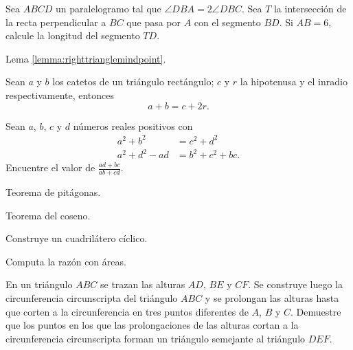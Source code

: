 \begin{problem}
Sea $ABCD$ un paralelogramo tal que $\angle DBA = 2\angle DBC$. Sea $T$ la intersección
de la recta perpendicular a $BC$ que pasa por $A$ con el segmento $BD$. Si
$AB = 6$, calcule la longitud del segmento $TD$.

\begin{hints}
	\begin{hint}
		Lema \ref{lemma:righttrianglemindpoint}.
	\end{hint}
\end{hints}
\end{problem}

\begin{problem}
Sean $a$ y $b$ los catetos de un triángulo rectángulo;
$c$ y $r$ la hipotenusa y el inradio respectivamente,
entonces
\[a + b = c + 2r.\]
\end{problem}

\begin{problem}
Sean $a$, $b$, $c$ y $d$ números reales positivos con
\begin{align*}
	a^2 + b^2      & =       c^2 + d^2  \\
	a^2 + d^2 - ad & =  b^2 + c^2 + bc.
\end{align*}
Encuentre el valor de $\frac{ad + bc}{ab + cd}$.

\begin{hints}
	\begin{hint}
		Teorema de pitágonas.
	\end{hint}

	\begin{hint}
		Teorema del coseno.
	\end{hint}

	\begin{hint}
		Construye un cuadrilátero cíclico.
	\end{hint}

	\begin{hint}
		Computa la razón con áreas.
	\end{hint}
\end{hints}
\end{problem}

\begin{problem}[OMAPA 2010/5]
En un triángulo $ABC$ se trazan las alturas $AD$, $BE$ y $CF$.
Se construye luego la circunferencia circunscripta del
triángulo $ABC$ y se prolongan las alturas hasta que corten
a la circunferencia en tres puntos diferentes de $A$, $B$ y $C$.
Demuestre que los puntos en los que las prolongaciones
de las alturas cortan a la circunferencia circunscripta
forman un triángulo semejante al triángulo $DEF$.
\end{problem}

